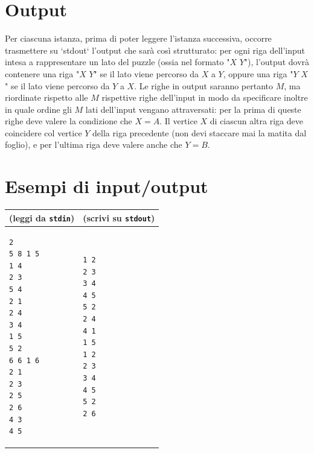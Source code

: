 \documentclass[a4paper,11pt]{article}
\begin{document}
\section*{Output}  
Per ciascuna istanza, prima di poter leggere l'istanza successiva, occorre trasmettere su `stdout` l'output che sarà così strutturato:
per ogni riga dell'input intesa a rappresentare un lato del puzzle (ossia nel formato "$X$ $Y$"), l'output dovrà contenere una riga "$X$ $Y$" se il lato viene percorso da $X$ a $Y$, oppure una riga "$Y$ $X$" se il lato viene percorso da $Y$ a $X$.
Le righe in output saranno pertanto $M$, ma riordinate rispetto alle $M$ rispettive righe dell'input in modo da specificare inoltre in quale ordine gli $M$ lati dell'input vengano attraversati: per la prima di queste righe deve valere la condizione che $X = A$. Il vertice $X$ di ciascun altra riga deve coincidere col vertice $Y$ della riga precedente (non devi staccare mai la matita dal foglio), e per l'ultima riga deve valere anche che $Y=B$.


\section*{Esempi di input/output}

  
    \noindent
    \begin{tabular}{p{11cm}|p{5cm}}
    \toprule
    \textbf{(leggi da \texttt{stdin})}
    & \textbf{(scrivi su \texttt{stdout})}
    \\
    \midrule
    \scriptsize
    \begin{verbatim}
2
5 8 1 5
1 4
2 3
5 4
2 1
2 4
3 4
1 5
5 2
6 6 1 6
2 1
2 3
2 5
2 6
4 3
4 5
\end{verbatim}
    &
    \scriptsize
    \begin{verbatim}
1 2
2 3
3 4
4 5
5 2
2 4
4 1
1 5
1 2
2 3
3 4
4 5
5 2
2 6
\end{verbatim}
    \\
    \bottomrule
    \end{tabular}
  
\end{document}
